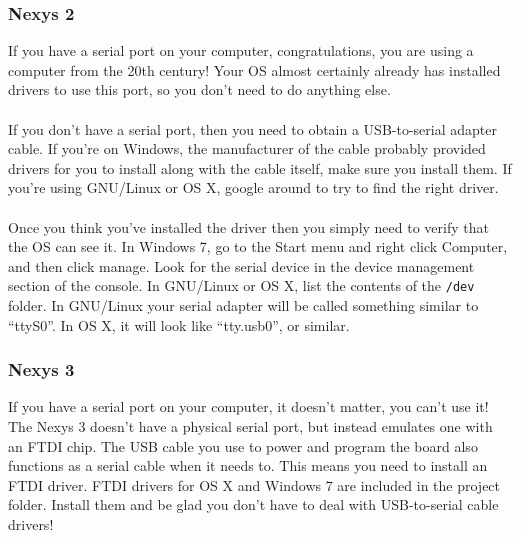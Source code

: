 \documentclass[notitlepage]{article}
\begin{document}
\subsubsection{Nexys 2}
If you have a serial port on your computer, congratulations, you are using a computer from the 20th century! Your OS almost certainly already has installed drivers to use this port, so you don't need to do anything else.\\\\
If you don't have a serial port, then you need to obtain a USB-to-serial adapter cable. If you're on Windows, the manufacturer of the cable probably provided drivers for you to install along with the cable itself, make sure you install them. If you're using GNU/Linux or OS X, google around to try to find the right driver.\\\\
Once you think you've installed the driver then you simply need to verify that the OS can see it. In Windows 7, go to the Start menu and right click Computer, and then click manage. Look for the serial device in the device management section of the console. In GNU/Linux or OS X, list the contents of the \texttt{/dev} folder. In GNU/Linux your serial adapter will be called something similar to ``ttyS0''. In OS X, it will look like ``tty.usb0'', or similar.
\subsubsection{Nexys 3}
If you have a serial port on your computer, it doesn't matter, you can't use it! The Nexys 3 doesn't have a physical serial port, but instead emulates one with an FTDI chip. The USB cable you use to power and program the board also functions as a serial cable when it needs to. This means you need to install an FTDI driver. FTDI drivers for OS X and Windows 7 are included in the project folder. Install them and be glad you don't have to deal with USB-to-serial cable drivers!
\end{document}
